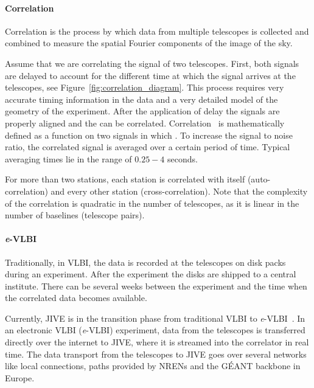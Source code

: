 \paragraph{Correlation}
Correlation is the process by which data from multiple telescopes is
collected and combined to measure the spatial Fourier components of
the image of the sky.

Assume that we are correlating the signal of two telescopes. First,
both signals are delayed to account for the different time at which
the signal arrives at the telescopes, see
Figure~\ref{fig:correlation_diagram}. This process requires very
accurate timing information in the data and a very detailed model of
the geometry of the experiment. After the application of delay the
signals are properly aligned and the can be correlated.
Correlation~\cite{def_correlation} is mathematically defined as a
function on two signals in which . To increase the signal to noise ratio, the
correlated signal is averaged over a certain period of time. Typical
averaging times lie in the range of $0.25-4$ seconds.

For more than two stations, each station is correlated with itself
(auto-correlation) and every other station (cross-correlation). Note
that the complexity of the correlation is quadratic in the number of
telescopes, as it is linear in the number of baselines (telescope
pairs).

\paragraph{{\it e}-VLBI}
Traditionally, in VLBI, the data is recorded at the telescopes on disk
packs during an experiment. After the experiment the disks are shipped
to a central institute. There can be several weeks between the
experiment and the time when the correlated data becomes available.

Currently, JIVE is in the transition phase from traditional VLBI to
{\it e}-VLBI~\cite{szomoru-2004}. In an electronic VLBI ({\it e}-VLBI)
experiment, data from the telescopes is transferred directly over the
internet to JIVE, where it is streamed into the correlator in real
time. The data transport from the telescopes to JIVE goes over several
networks like local connections, paths provided by NRENs and the
G\'EANT backbone in Europe.

